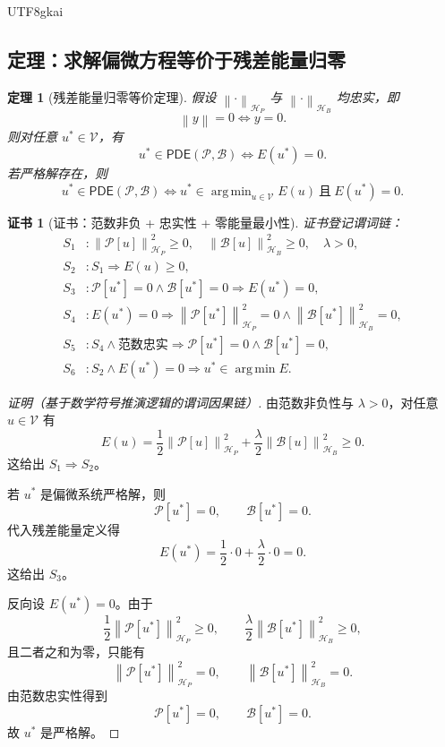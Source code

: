 \documentclass[12pt]{article}
\newtheorem{theorem}{定理}[section]
\newtheorem{Certificate}{证书}[section]
\newcommand{\Pcal}{\mathcal P}
\newcommand{\Bcal}{\mathcal B}
\newcommand{\Vcal}{\mathcal V}
\newcommand{\Hcal}{\mathcal H}
\newcommand{\norm}[1]{\left\lVert #1 \right\rVert}
\DeclareMathOperator*{\argmin}{arg\,min}
\begin{document}
\begin{CJK*}{UTF8}{gkai}
\subsection{定理：求解偏微方程等价于残差能量归零}
\label{subsec:tex58-solution-energy-theorem}

\begin{theorem}[残差能量归零等价定理]
\label{thm:tex58-solution-energy-equivalence}
假设 \(\norm{\cdot}_{\Hcal_P}\) 与 \(\norm{\cdot}_{\Hcal_B}\) 均忠实，即
\[
  \norm{y}=0\Longleftrightarrow y=0.
\]
则对任意 \(u^\ast\in\Vcal\)，有
\[
  u^\ast\in\mathsf{PDE}(\Pcal,\Bcal)
  \Longleftrightarrow
  E(u^\ast)=0.
\]
若严格解存在，则
\[
  u^\ast\in\mathsf{PDE}(\Pcal,\Bcal)
  \Longleftrightarrow
  u^\ast\in\argmin_{u\in\Vcal}E(u)
  \ \text{且}\
  E(u^\ast)=0.
\]
\end{theorem}

\begin{Certificate}[证书：范数非负 + 忠实性 + 零能量最小性]
\label{cert:tex58-solution-energy-equivalence}
证书登记谓词链：
\[
\begin{aligned}
  S_1 &: \norm{\Pcal[u]}_{\Hcal_P}^{2}\ge0,\quad
         \norm{\Bcal[u]}_{\Hcal_B}^{2}\ge0,\quad \lambda>0,\\
  S_2 &: S_1\Rightarrow E(u)\ge0,\\
  S_3 &: \Pcal[u^\ast]=0\wedge\Bcal[u^\ast]=0
         \Rightarrow E(u^\ast)=0,\\
  S_4 &: E(u^\ast)=0
         \Rightarrow \norm{\Pcal[u^\ast]}_{\Hcal_P}^{2}=0
         \wedge\norm{\Bcal[u^\ast]}_{\Hcal_B}^{2}=0,\\
  S_5 &: S_4\wedge\text{范数忠实}
         \Rightarrow \Pcal[u^\ast]=0\wedge\Bcal[u^\ast]=0,\\
  S_6 &: S_2\wedge E(u^\ast)=0
         \Rightarrow u^\ast\in\argmin E.
\end{aligned}
\]
\end{Certificate}

\begin{proof}[证明（基于数学符号推演逻辑的谓词因果链）]
由范数非负性与 \(\lambda>0\)，对任意 \(u\in\Vcal\) 有
\[
  E(u)
  =
  \frac12\norm{\Pcal[u]}_{\Hcal_P}^{2}
  +
  \frac{\lambda}{2}\norm{\Bcal[u]}_{\Hcal_B}^{2}
  \ge0.
\]
这给出 \(S_1\Rightarrow S_2\)。

若 \(u^\ast\) 是偏微系统严格解，则
\[
  \Pcal[u^\ast]=0,
  \qquad
  \Bcal[u^\ast]=0.
\]
代入残差能量定义得
\[
  E(u^\ast)
  =
  \frac12\cdot0
  +
  \frac{\lambda}{2}\cdot0
  =
  0.
\]
这给出 \(S_3\)。

反向设 \(E(u^\ast)=0\)。由于
\[
  \frac12\norm{\Pcal[u^\ast]}_{\Hcal_P}^{2}\ge0,
  \qquad
  \frac{\lambda}{2}\norm{\Bcal[u^\ast]}_{\Hcal_B}^{2}\ge0,
\]
且二者之和为零，只能有
\[
  \norm{\Pcal[u^\ast]}_{\Hcal_P}^{2}=0,
  \qquad
  \norm{\Bcal[u^\ast]}_{\Hcal_B}^{2}=0.
\]
由范数忠实性得到
\[
  \Pcal[u^\ast]=0,
  \qquad
  \Bcal[u^\ast]=0.
\]
故 \(u^\ast\) 是严格解。


\end{proof}
\end{CJK*}
\end{document}
